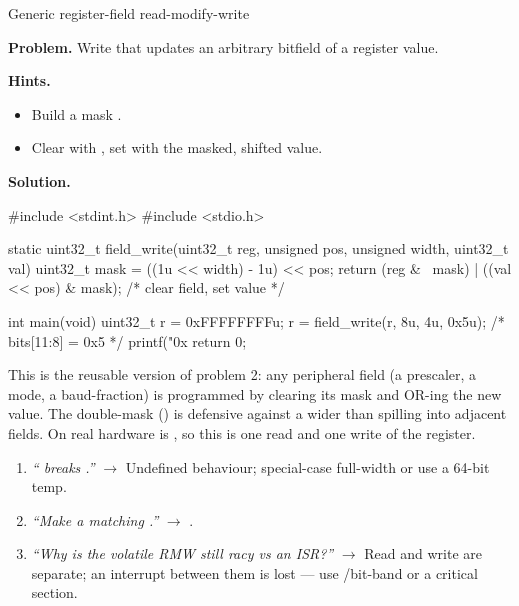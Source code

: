 \begin{gymproblem}{Generic register-field read-modify-write}

\textbf{Problem.} Write  that updates
an arbitrary bitfield of a register value.

\textbf{Hints.}
\begin{itemize}
\item Build a mask .
\item Clear with , set with the masked,
  shifted value.
\end{itemize}

\attempt

\textbf{Solution.}
\begin{cgym}
#include <stdint.h>
#include <stdio.h>

static uint32_t field_write(uint32_t reg, unsigned pos, unsigned width,
                            uint32_t val) {
    uint32_t mask = ((1u << width) - 1u) << pos;
    return (reg & ~mask) | ((val << pos) & mask);   /* clear field, set value */
}

int main(void) {
    uint32_t r = 0xFFFFFFFFu;
    r = field_write(r, 8u, 4u, 0x5u);   /* bits[11:8] = 0x5 */
    printf("0x%
    return 0;
}
\end{cgym}

This is the reusable version of problem 2: any peripheral field (a prescaler, a
mode, a baud-fraction) is programmed by clearing its mask and OR-ing the new
value. The double-mask () is defensive against a
 wider than  spilling into adjacent fields. On real
hardware  is , so this is one read and one write of the
register.

\followups
\begin{enumerate}
\item \emph{`` breaks .''} $\rightarrow$
  Undefined behaviour; special-case full-width or use a 64-bit temp.
\item \emph{``Make a matching .''} $\rightarrow$
  .
\item \emph{``Why is the volatile RMW still racy vs an ISR?''} $\rightarrow$
  Read and write are separate; an interrupt between them is lost --- use
  /bit-band or a critical section.
\end{enumerate}
\end{gymproblem}

